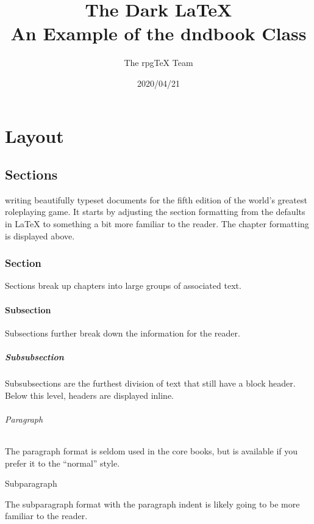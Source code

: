\documentclass[letterpaper,twocolumn,openany,nodeprecatedcode]{dndbook}
\title{The Dark \LaTeX{} \\
\large An Example of the dndbook Class}
\author{The rpgTeX Team}
\date{2020/04/21}
\begin{document}
\frontmatter

\maketitle

\tableofcontents{}

\mainmatter{}

\part{Layout}

\chapter{Sections}

 writing beautifully typeset documents for the fifth edition of the world's greatest roleplaying game. It starts by adjusting the section formatting from the defaults in \LaTeX{} to something a bit more familiar to the reader. The chapter formatting is displayed above.

\section{Section}
Sections break up chapters into large groups of associated text.

\subsection{Subsection}
Subsections further break down the information for the reader.

\subsubsection{Subsubsection}
Subsubsections are the furthest division of text that still have a block header. Below this level, headers are displayed inline.

\paragraph{Paragraph}
The paragraph format is seldom used in the core books, but is available if you prefer it to the ``normal'' style.

\subparagraph{Subparagraph}
The subparagraph format with the paragraph indent is likely going to be more familiar to the reader.
\end{document}
